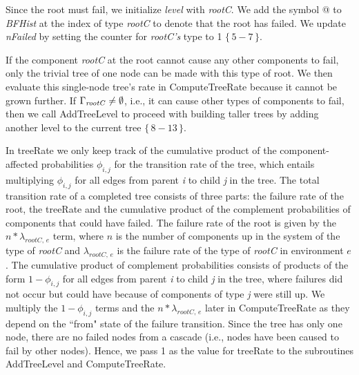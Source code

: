 \documentclass[12pt]{article}
\newcommand{\varName}[1]{\textrm{\it#1}}
\newcommand{\citeBlock}[2]{$\{\,#1 - #2\,\}$}
\begin{document}
Since the root must fail, we initialize \textit{level} with \textit{rootC}. We add the symbol @ to \textit{BFHist} at the index of type \textit{rootC} to denote that the root has failed. We update \textit{nFailed} by setting the counter for \varName{rootC's} type to 1 \citeBlock{5}{7}.

If the component \textit{rootC} at the root cannot cause any other components to fail, only the trivial tree of one node can be made with this type of root. We then evaluate this single-node tree's rate in ComputeTreeRate because it cannot be grown further. If $\Gamma_{\textrm{\textit{rootC}}} \neq \emptyset$, i.e., it can cause other types of components to fail, then we call AddTreeLevel to proceed with building taller trees by adding another level to the current tree \citeBlock{8}{13}.

In treeRate we only keep track of the cumulative product of the component-affected probabilities $\phi_{i,j}$ for the transition rate of the tree, which entails multiplying $\phi_{i, j}$ for all edges from parent \varName{i} to child \varName{j} in the tree. The total transition rate of a completed tree consists of three parts: the failure rate of the root, the treeRate and the cumulative product of the complement probabilities of components that could have failed. The failure rate of the root is given by the $n*\lambda_{rootC, \,e}$ term, where $n$ is the number of components up in the system of the type of \varName{rootC} and $\lambda_{rootC, \,e}$ is the failure rate of the type of \varName{rootC} in environment $e$. The cumulative product of complement probabilities consists of products of the form $1-\phi_{i, j}$ for all edges from parent \varName{i} to child \varName{j} in the tree, where failures did not occur but could have because of components of type \varName{j} were still up. We multiply the $1-\phi_{i,j}$ terms and the $n*\lambda_{rootC, \,e}$ later in ComputeTreeRate as they depend on the ``from" state of the failure transition. Since the tree has only one node, there are no failed nodes from a cascade (i.e., nodes have been caused to fail by other nodes). Hence, we pass 1 as the value for treeRate to the subroutines AddTreeLevel and ComputeTreeRate.
\end{document}
